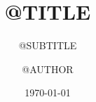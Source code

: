 \documentclass[10pt]{beamer}
\title{@TITLE}
\subtitle{@SUBTITLE}
\author[@AUTHOR]{@AUTHOR}
\date{\today}
\begin{document}
\begin{frame}[fragile]
  \titlepage
\end{frame}



\end{document}
